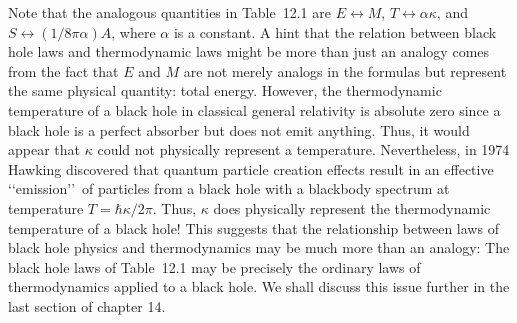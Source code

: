 Note that the analogous quantities in Table~12.1 are \(E\leftrightarrow M\),
\(T\leftrightarrow\alpha\kappa\), and \(S\leftrightarrow(1/8\pi\alpha)A\), where
\(\alpha\) is a constant. A hint that the relation between black hole laws and
thermodynamic laws might be more than just an analogy comes from the fact that
\(E\) and \(M\) are not merely analogs in the formulas but represent the same
physical quantity: total energy. However, the thermodynamic temperature of a black
hole in classical general relativity is absolute zero since a black hole is a perfect
absorber but does not emit anything. Thus, it would appear that \(\kappa\) could not
physically represent a temperature. Nevertheless, in 1974 Hawking discovered that
quantum particle creation effects result in an effective \lq\lq emission\rq\rq\ of
particles from a black hole with a blackbody spectrum at temperature
\(T=\hbar\kappa/2\pi\). Thus, \(\kappa\) does physically represent the thermodynamic
temperature of a black hole! This suggests that the relationship between laws of black
hole physics and thermodynamics may be much more than an analogy: The black hole
laws of Table~12.1 may be precisely the ordinary laws of thermodynamics applied to
a black hole. We shall discuss this issue further in the last section of chapter 14.

